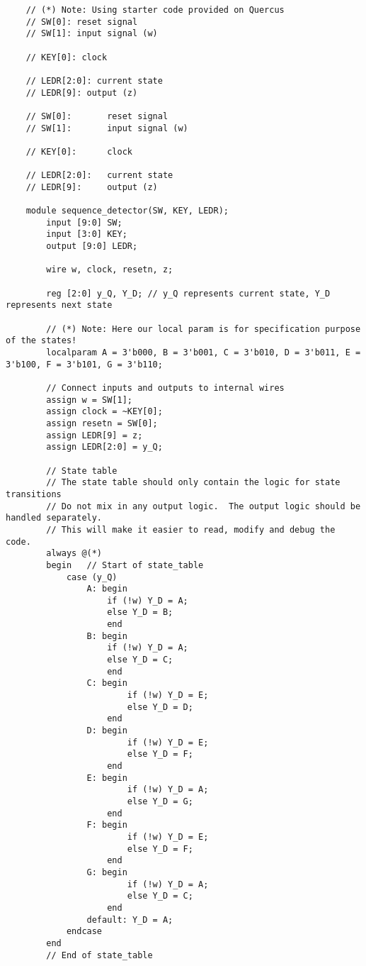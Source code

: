 \documentclass{article}
\begin{document}
\begin{verbatim}
    // (*) Note: Using starter code provided on Quercus
    // SW[0]: reset signal
    // SW[1]: input signal (w)

    // KEY[0]: clock

    // LEDR[2:0]: current state
    // LEDR[9]: output (z)

    // SW[0]:       reset signal
    // SW[1]:       input signal (w)

    // KEY[0]:      clock

    // LEDR[2:0]:   current state
    // LEDR[9]:     output (z)

    module sequence_detector(SW, KEY, LEDR);
        input [9:0] SW;
        input [3:0] KEY;
        output [9:0] LEDR;

        wire w, clock, resetn, z;
        
        reg [2:0] y_Q, Y_D; // y_Q represents current state, Y_D represents next state
    
        // (*) Note: Here our local param is for specification purpose of the states!
        localparam A = 3'b000, B = 3'b001, C = 3'b010, D = 3'b011, E = 3'b100, F = 3'b101, G = 3'b110;
        
        // Connect inputs and outputs to internal wires
        assign w = SW[1];
        assign clock = ~KEY[0];
        assign resetn = SW[0];
        assign LEDR[9] = z;
        assign LEDR[2:0] = y_Q;

        // State table
        // The state table should only contain the logic for state transitions
        // Do not mix in any output logic.  The output logic should be handled separately.
        // This will make it easier to read, modify and debug the code.
        always @(*)
        begin   // Start of state_table
            case (y_Q)
                A: begin
                    if (!w) Y_D = A;
                    else Y_D = B;
                    end
                B: begin
                    if (!w) Y_D = A;
                    else Y_D = C;
                    end
                C: begin
                        if (!w) Y_D = E;
                        else Y_D = D;
                    end
                D: begin
                        if (!w) Y_D = E;
                        else Y_D = F;
                    end
                E: begin
                        if (!w) Y_D = A;
                        else Y_D = G;
                    end
                F: begin
                        if (!w) Y_D = E;
                        else Y_D = F;
                    end
                G: begin
                        if (!w) Y_D = A;
                        else Y_D = C;
                    end
                default: Y_D = A;
            endcase
        end     
        // End of state_table


\end{verbatim}
\end{document}

